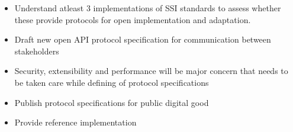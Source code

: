 \begin{itemize}
    \item Understand atleast 3 implementations of SSI standards to assess whether these provide protocols for open implementation and adaptation. 
    \item Draft new open \ac{API} protocol specification for communication between stakeholders 
    \item Security, extensibility and performance will be major concern that needs to be taken care while defining of protocol specifications
    \item Publish protocol specifications for public digital good
    \item Provide reference implementation
\end{itemize}
